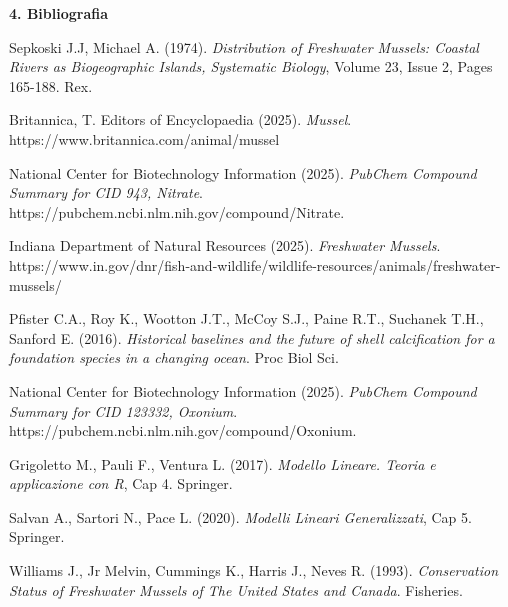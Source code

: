 \documentclass{article} %
\begin{document}
\begin{spacing}{1.2}
    \newpage
    \begin{flushleft}
        \textbf{\Huge 4. \: Bibliografia}
    \end{flushleft}
    \renewcommand{\refname}{}
    \begin{thebibliography}{9}

    Sepkoski J.J, Michael A. (1974). \textit{Distribution of Freshwater Mussels: Coastal Rivers as Biogeographic Islands, Systematic Biology}, Volume 23, Issue 2, Pages 165-188. Rex.

    Britannica, T. Editors of Encyclopaedia (2025). \textit{Mussel}. \\https://www.britannica.com/animal/mussel

    National Center for Biotechnology Information (2025). \textit{PubChem Compound Summary for CID 943, Nitrate}. \\https://pubchem.ncbi.nlm.nih.gov/compound/Nitrate.

    Indiana Department of Natural Resources (2025). \textit{Freshwater Mussels}. \\https://www.in.gov/dnr/fish-and-wildlife/wildlife-resources/animals/freshwater-mussels/

    Pfister C.A., Roy K., Wootton J.T., McCoy S.J., Paine R.T., Suchanek T.H., Sanford E. (2016). \textit{Historical baselines and the future of shell calcification for a foundation species in a changing ocean}. Proc Biol Sci.

    National Center for Biotechnology Information (2025). \textit{PubChem Compound Summary for CID 123332, Oxonium}.\\ https://pubchem.ncbi.nlm.nih.gov/compound/Oxonium.

    Grigoletto M., Pauli F., Ventura L. (2017). \textit{Modello Lineare. Teoria e applicazione con R}, Cap 4. Springer.

    Salvan A., Sartori N., Pace L. (2020). \textit{Modelli Lineari Generalizzati}, Cap 5. Springer.

    Williams J., Jr Melvin, Cummings K., Harris J., Neves R. (1993). \textit{Conservation Status of Freshwater Mussels of The United States and Canada}. Fisheries. 


\end{thebibliography}
\end{spacing}
\end{document}

